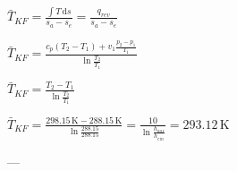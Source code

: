 \( \bar{T}_{KF} = \frac{\int T \, \text{d}s}{s_{a} - s_{e}} = \frac{q_{rev}}{s_{a} - s_{e}} \)  

\( \bar{T}_{KF} = \frac{c_{p} (T_{2} - T_{1}) + v_{1} \frac{p_{2} - p_{1}}{T_{1}}}{\ln \frac{T_{2}}{T_{1}}} \)  

\( \bar{T}_{KF} = \frac{T_{2} - T_{1}}{\ln \frac{T_{2}}{T_{1}}} \)  

\( \bar{T}_{KF} = \frac{298.15 \, \text{K} - 288.15 \, \text{K}}{\ln \frac{288.15}{288.15}} = \frac{10}{\ln \frac{h_{aus}}{h_{ein}}} = 293.12 \, \text{K} \)  

---